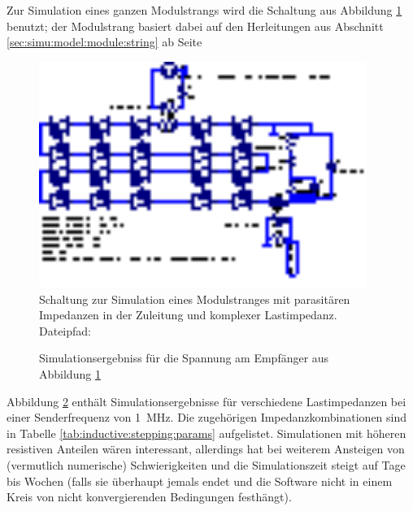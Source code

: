 Zur  Simulation eines  ganzen Modulstrangs  wird die  Schaltung aus  Abbildung
\ref{fig:ltspice:inductive:complete}  benutzt; der  Modulstrang basiert  dabei
auf den Herleitungen aus Abschnitt \ref{sec:simu:model:module:string} ab Seite
\pageref{sec:simu:model:module:string}

\begin{figure}[h!tb]
    \centering
    \includegraphics[width=0.95\textwidth]{images/ltspice/jac/inductive.eps}
    \caption[Induktive Einkopplung, -Schaltung f\"ur Modulstrang]{%
        Schaltung  zur   Simulation  eines  Modulstranges   mit  parasit\"aren
        Impedanzen in der Zuleitung und komplexer Lastimpedanz.\protect\\
        Dateipfad: %
    }
    \label{fig:ltspice:inductive:complete}
\end{figure}

\begin{figure}[h!tb]
    
    \caption[Simulationsergebniss, induktive Einkopplung, Modulstrang]{%
        Simulationsergebniss f\"ur die Spannung am Empf\"anger aus Abbildung
        \ref{fig:ltspice:inductive:complete}%
    }
    \label{fig:simu:inductive:stepping}
\end{figure}

Abbildung  \ref{fig:simu:inductive:stepping}  enth\"alt  Simulationsergebnisse
f\"ur    verschiedene   Lastimpedanzen    bei    einer   Senderfrequenz    von
\SI{1}{\mega\hertz}.   Die zugeh\"origen Impedanzkombinationen sind in Tabelle
\ref{tab:inductive:stepping:params}  aufgelistet. Simulationen  mit  h\"oheren
resistiven  Anteilen w\"aren  interessant, allerdings  hat   bei
weiterem  Ansteigen von   (vermutlich  numerische) Schwierigkeiten
und  die Simulationszeit  steigt auf  Tage bis  Wochen (falls  sie \"uberhaupt
jemals endet und  die Software nicht in einem Kreis  von nicht konvergierenden
Bedingungen festh\"angt).

